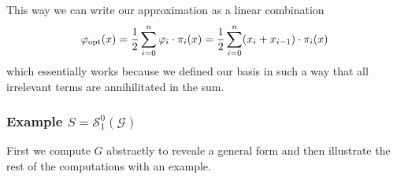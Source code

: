 This way we can write our approximation as a linear combination
\[\varphi_{\operatorname{opt}}(x) = \frac{1}{2}\sum_{i=0}^n \varphi_i \cdot \pi_i(x) = \frac{1}{2} \sum_{i=0}^n (x_i + x_{i-1}) \cdot \pi_i(x)\]
which essentially works because we defined our basis in such a way that all irrelevant terms are annihilitated in the sum.

\begin{center}
   
\end{center}



\subsubsection{Example \(S = \mathcal{S}_1^{0}(\mathcal{G})\)}
First we compute \(G\) abstractly to reveale a general form and then illustrate the rest of the computations with an example.

